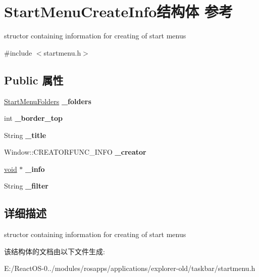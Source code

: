 \hypertarget{struct_start_menu_create_info}{}\section{Start\+Menu\+Create\+Info结构体 参考}
\label{struct_start_menu_create_info}


structor containing information for creating of start menus  




{\ttfamily \#include $<$startmenu.\+h$>$}

\subsection*{Public 属性}
\begin{DoxyCompactItemize}
\item 
\mbox{\label{struct_start_menu_create_info_a2543da6c13c29129d9577caf951e8de3}} 
\hyperlink{classlist}{Start\+Menu\+Folders} {\bfseries \+\_\+folders}
\item 
\mbox{\label{struct_start_menu_create_info_ac23950d85a0bf8f0b648138705b2c022}} 
int {\bfseries \+\_\+border\+\_\+top}
\item 
\mbox{\label{struct_start_menu_create_info_af25c8b8be597ebf2a115c88fb9e64c78}} 
String {\bfseries \+\_\+title}
\item 
\mbox{\label{struct_start_menu_create_info_a63280ae2fff78de80d72d49f842830f2}} 
Window\+::\+C\+R\+E\+A\+T\+O\+R\+F\+U\+N\+C\+\_\+\+I\+N\+FO {\bfseries \+\_\+creator}
\item 
\mbox{\label{struct_start_menu_create_info_a176fe52b0108c02ba7208c8e0614d1f6}} 
\hyperlink{interfacevoid}{void} $\ast$ {\bfseries \+\_\+info}
\item 
\mbox{\label{struct_start_menu_create_info_a9d078c4e313102ad9410baa552295857}} 
String {\bfseries \+\_\+filter}
\end{DoxyCompactItemize}


\subsection{详细描述}
structor containing information for creating of start menus 

该结构体的文档由以下文件生成\+:\begin{DoxyCompactItemize}
\item 
E\+:/\+React\+O\+S-\/0../modules/rosapps/applications/explorer-\/old/taskbar/startmenu.\+h\end{DoxyCompactItemize}
